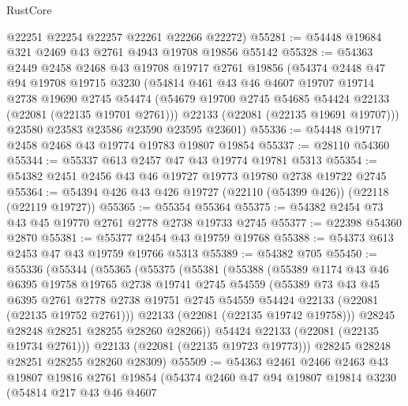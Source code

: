 \begin{lexlean}{RustCore}
\begin{coremodule}
      @22251
      @22254
      @22257
      @22261
      @22266
      @22272)
@55281 := @54448 @19684 @321 @2469 @43 @2761 @4943 @19708 @19856 @55142
@55328 := @54363
    @2449
    @2458
    @2468
    @43
    @19708
    @19717
    @2761
    @19856
    (@54374
      @2448
      @47
      @94
      @19708
      @19715
      @3230
      (@54814
        @461
        @43
        @46
        @4607
        @19707
        @19714
        @2738
        @19690
        @2745
        @54474
        (@54679 @19700 @2745 @54685 @54424 @22133 (@22081 (@22135 @19701 @2761)))
        @22133
        (@22081 (@22135 @19691 @19707)))
      @23580
      @23583
      @23586
      @23590
      @23595
      @23601)
@55336 := @54448 @19717 @2458 @2468 @43 @19774 @19783 @19807 @19854
@55337 := @28110 @54360
@55344 := @55337 @613 @2457 @47 @43 @19774 @19781 @5313
@55354 := @54382 @2451 @2456 @43 @46 @19727 @19773 @19780 @2738 @19722 @2745
@55364 := @54394 @426 @43 @426 @19727 (@22110 (@54399 @426)) (@22118 (@22119 @19727))
@55365 := @55354 @55364
@55375 := @54382 @2454 @73 @43 @45 @19770 @2761 @2778 @2738 @19733 @2745
@55377 := @22398 @54360 @2870
@55381 := @55377 @2454 @43 @19759 @19768
@55388 := @54373 @613 @2453 @47 @43 @19759 @19766 @5313
@55389 := @54382 @705
@55450 := @55336
    (@55344
      (@55365
        (@55375
          (@55381
            (@55388
              (@55389
                @1174
                @43
                @46
                @6395
                @19758
                @19765
                @2738
                @19741
                @2745
                @54559
                (@55389
                  @73
                  @43
                  @45
                  @6395
                  @2761
                  @2778
                  @2738
                  @19751
                  @2745
                  @54559
                  @54424
                  @22133
                  (@22081 (@22135 @19752 @2761)))
                @22133
                (@22081 (@22135 @19742 @19758)))
              @28245
              @28248
              @28251
              @28255
              @28260
              @28266))
          @54424
          @22133
          (@22081 (@22135 @19734 @2761)))
        @22133
        (@22081 (@22135 @19723 @19773)))
      @28245
      @28248
      @28251
      @28255
      @28260
      @28309)
@55509 := @54363
    @2461
    @2466
    @2463
    @43
    @19807
    @19816
    @2761
    @19854
    (@54374
      @2460
      @47
      @94
      @19807
      @19814
      @3230
      (@54814
        @217
        @43
        @46
        @4607

\end{coremodule}
\end{lexlean}
